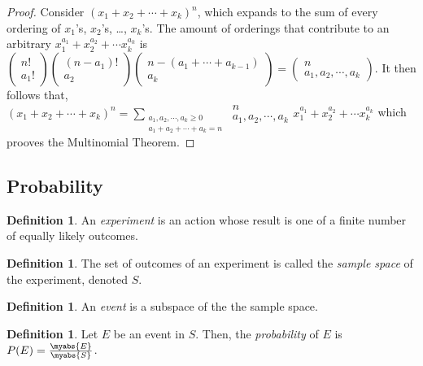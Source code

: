 \documentclass[11pt]{article}
\theoremstyle{definition}
\newtheorem{definition}[theorem]{Definition}
\begin{document}
\begin{proof}
    Consider ${(x_1+x_2+\cdots +x_k)}^n$, which expands to the sum of every ordering of $x_1$'s, $x_2$'s, \ldots, $x_k$'s. The amount of orderings that contribute to an arbitrary $x_1^{a_1} + x_2^{a_2} + \cdots x_k^{a_k}$ is $(\begin{smallmatrix} n!\\a_1! \end{smallmatrix})(\begin{smallmatrix} (n-a_1)!\\a_2 \end{smallmatrix})(\begin{smallmatrix} n-(a_1+\cdots+a_{k-1})\\a_k \end{smallmatrix}) = (\begin{smallmatrix} n \\ a_1,a_2,\cdots,a_k \end{smallmatrix})$. It then follows that, \\
        ${(x_1+x_2+\cdots+x_k)}^{n}=\sum_{\substack{a_1,a_2,\cdots,a_k \geq 0 \\ a_1+a_2+\cdots+a_k=n}}
        \begin{smallmatrix} n \\ a_1,a_2,\cdots,a_k \end{smallmatrix}
        x_1^{a_1} + x_2^{a_2} + \cdots x_k^{a_k}$ which prooves the Multinomial Theorem.
\end{proof}
\subsection{Probability}
\begin{definition}
    An \emph{experiment} is an action whose result is one of a finite number of equally likely outcomes.
\end{definition}
\begin{definition}
    The set of outcomes of an experiment is called the \emph{sample space} of the experiment, denoted $S$.
\end{definition}
\begin{definition}
    An \emph{event} is a subspace of the the sample space.
\end{definition}
\begin{definition}
    Let $E$ be an event in $S$. Then, the \emph{probability} of $E$ is $P(E)=\frac{\myabs{E}}{\myabs{S}}$.
\end{definition} 
\section{}
\end{document}
